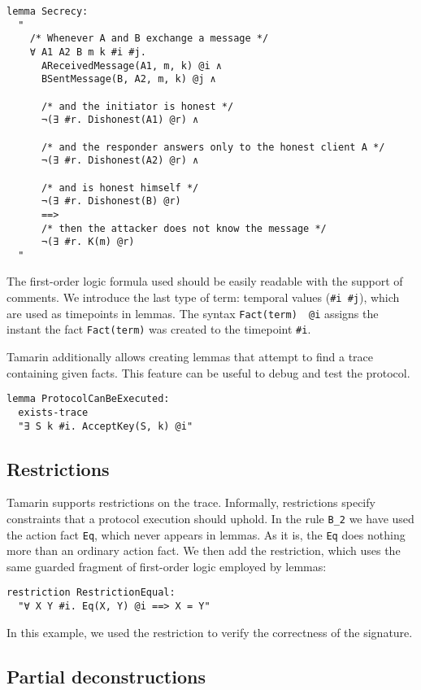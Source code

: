 \begin{lstlisting}
lemma Secrecy:
  "
    /* Whenever A and B exchange a message */
    ∀ A1 A2 B m k #i #j.
      AReceivedMessage(A1, m, k) @i ∧
      BSentMessage(B, A2, m, k) @j ∧

      /* and the initiator is honest */
      ¬(∃ #r. Dishonest(A1) @r) ∧

      /* and the responder answers only to the honest client A */
      ¬(∃ #r. Dishonest(A2) @r) ∧

      /* and is honest himself */
      ¬(∃ #r. Dishonest(B) @r)
      ==> 
      /* then the attacker does not know the message */
      ¬(∃ #r. K(m) @r)
  "
\end{lstlisting}

The first-order logic formula used should be easily readable with the support of comments. We introduce the last type of term: temporal values (\lstinline{#i #j}), which are used as timepoints in lemmas. The syntax \lstinline{Fact(term)  @i} assigns the instant the fact \lstinline{Fact(term)} was created to the timepoint \lstinline{#i}.

Tamarin additionally allows creating lemmas that attempt to find a trace containing given facts. This feature can be useful to debug and test the protocol.
\begin{lstlisting}
lemma ProtocolCanBeExecuted:
  exists-trace
  "∃ S k #i. AcceptKey(S, k) @i"
\end{lstlisting}

\subsection{Restrictions}

Tamarin supports restrictions on the trace. Informally, restrictions specify constraints that a protocol execution should uphold. In the rule \lstinline{B_2} we have used the action fact \lstinline{Eq}, which never appears in lemmas. As it is, the \lstinline{Eq} does nothing more than an ordinary action fact. We then add the restriction, which uses the same guarded fragment of first-order logic employed by lemmas:

\begin{lstlisting}
restriction RestrictionEqual:
  "∀ X Y #i. Eq(X, Y) @i ==> X = Y"
\end{lstlisting}

In this example, we used the restriction to verify the correctness of the signature.

\subsection{Partial deconstructions}

